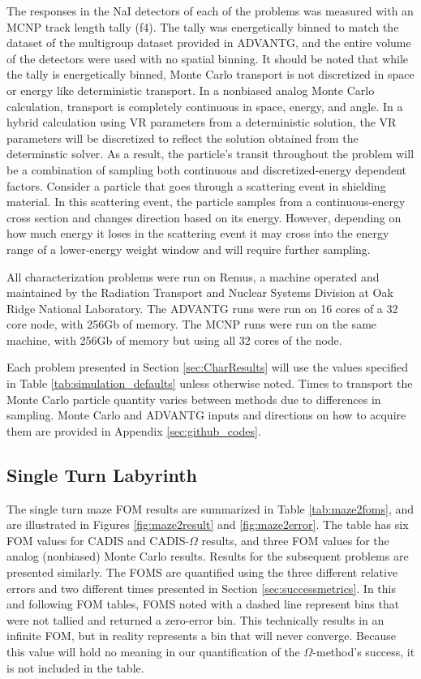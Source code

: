 The responses in the NaI detectors of each of
the problems was measured with an MCNP track length tally (f4). The tally was
energetically binned to match the dataset of the multigroup dataset provided in
ADVANTG, and the entire volume of the detectors were used with no spatial
binning. It should be noted that while the tally is energetically binned, Monte
Carlo transport is not discretized in space or energy like deterministic
transport. In a nonbiased analog Monte Carlo calculation, transport is
completely continuous in space, energy, and angle. In a hybrid calculation using
VR parameters from a deterministic solution, the VR parameters will be
discretized to reflect the solution obtained from the determinstic solver. As a
result, the particle's transit throughout the
problem will be a combination of sampling both continuous and discretized-energy
dependent factors. Consider a particle that goes through a scattering event
in shielding material. In this scattering event, the particle samples from a
continuous-energy cross section and changes direction based on its energy.
However, depending on how much energy it loses in the scattering event it may
cross into the energy range of a lower-energy weight window and will require
further sampling.

All characterization problems were run on Remus, a machine operated and
maintained by the Radiation Transport and Nuclear Systems Division at Oak Ridge
National Laboratory. The ADVANTG runs were run on 16 cores of a 32 core node,
with 256Gb of memory. The MCNP runs were run on the same machine, with 256Gb of
memory but using all 32 cores of the node.

Each problem presented in Section \ref{sec:CharResults} will
use the values specified in Table \ref{tab:simulation_defaults}
unless otherwise noted.
Times to transport the Monte Carlo particle quantity varies between methods
due to differences in sampling. Monte Carlo and ADVANTG
inputs and directions on how to acquire them are
provided in Appendix \ref{sec:github_codes}.

\subsection{Single Turn Labyrinth}

The single turn maze FOM results are summarized in Table \ref{tab:maze2foms},
and are illustrated in Figures \ref{fig:maze2result} and \ref{fig:maze2error}.
The table has six FOM values for CADIS and CADIS-$\Omega$ results, and three FOM
values for the analog (nonbiased) Monte Carlo results. Results for the
subsequent problems are presented similarly. The FOMS are quantified
using the three different relative errors and two different times presented in
Section \ref{sec:successmetrics}. In this and following FOM tables, FOMS noted
with a dashed line represent bins that were not tallied and returned a
zero-error bin. This technically results in an infinite FOM, but in reality
represents a bin that will never converge. Because this value will hold no
meaning in our quantification of the $\Omega$-method's success, it
is not included in the table.

